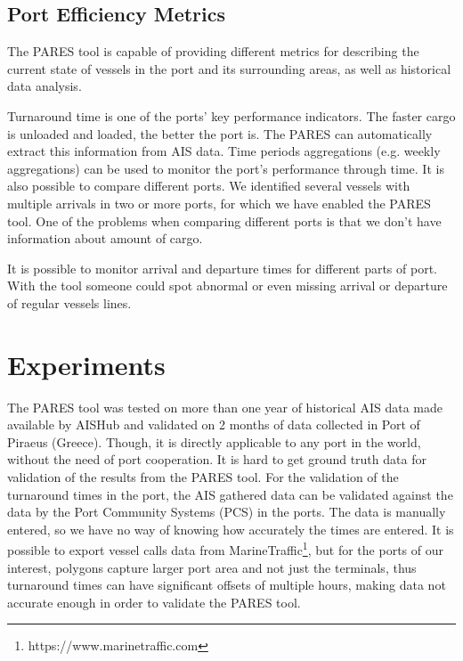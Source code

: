 \documentclass[conference]{IEEEtran}
\begin{document}
\subsection{Port Efficiency Metrics}

The PARES tool is capable of providing different metrics for describing the current state of vessels in the port and its surrounding areas, as well as historical data analysis.

Turnaround time is one of the ports' key performance indicators. The faster cargo is unloaded and loaded, the better the port is. The PARES can automatically extract this information from AIS data. Time periods aggregations (e.g. weekly aggregations) can be used to monitor the port's performance through time. It is also possible to compare different ports. We identified several vessels with multiple arrivals in two or more ports, for which we have enabled the PARES tool. One of the problems when comparing different ports is that we don't have information about amount of cargo.

It is possible to monitor arrival and departure times for different parts of port. With the tool someone could spot abnormal or even missing arrival or departure of regular vessels lines. 


\section{Experiments}


The PARES tool was tested on more than one year of historical AIS data made available by AISHub and validated on 2 months of data collected in Port of Piraeus (Greece). Though, it is directly applicable to any port in the world, without the need of port cooperation. It is hard to get ground truth data for validation of the results from the PARES tool. For the validation of the turnaround times in the port, the AIS gathered data can be validated against the data by the Port Community Systems (PCS) in the ports. The data is manually entered, so we have no way of knowing how accurately the times are entered. It is possible to export vessel calls data from MarineTraffic\footnote{https://www.marinetraffic.com}, but for the ports of our interest, polygons capture larger port area and not just the terminals, thus turnaround times can have significant offsets of multiple hours, making data not accurate enough in order to validate the PARES tool.
\end{document}
